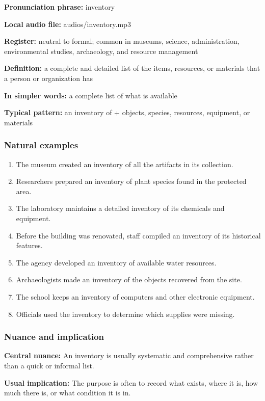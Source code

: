 \documentclass[11pt]{article}
\begin{document}
\textbf{Pronunciation phrase:} inventory

\textbf{Local audio file:} audios/inventory.mp3

\textbf{Register:} neutral to formal; common in museums, science, administration, environmental studies, archaeology, and resource management

\textbf{Definition:} a complete and detailed list of the items, resources, or materials that a person or organization has

\textbf{In simpler words:} a complete list of what is available

\textbf{Typical pattern:} an inventory of + objects, species, resources, equipment, or materials

\subsubsection{Natural examples}
\begin{enumerate}
  \item The museum created an inventory of all the artifacts in its collection.
  \item Researchers prepared an inventory of plant species found in the protected area.
  \item The laboratory maintains a detailed inventory of its chemicals and equipment.
  \item Before the building was renovated, staff compiled an inventory of its historical features.
  \item The agency developed an inventory of available water resources.
  \item Archaeologists made an inventory of the objects recovered from the site.
  \item The school keeps an inventory of computers and other electronic equipment.
  \item Officials used the inventory to determine which supplies were missing.
\end{enumerate}

\subsubsection{Nuance and implication}
\textbf{Central nuance:} An inventory is usually systematic and comprehensive rather than a quick or informal list.

\textbf{Usual implication:} The purpose is often to record what exists, where it is, how much there is, or what condition it is in.
\end{document}
